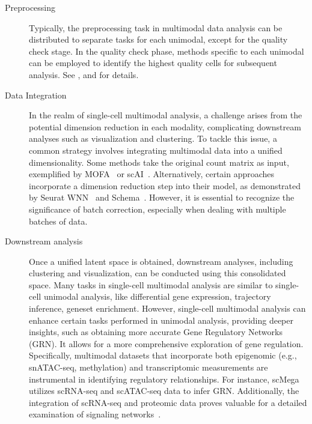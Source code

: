 \begin{description}
	\item[Preprocessing]
	Typically, the preprocessing task in multimodal data analysis can be distributed to separate tasks for each unimodal, except for the quality check stage. In the quality check phase, methods specific to each unimodal can be employed to identify the highest quality cells for subsequent analysis. See ,  and  for details.

	\item[Data Integration]
	In the realm of single-cell multimodal analysis, a challenge arises from the potential dimension reduction in each modality, complicating downstream analyses such as visualization and clustering. To tackle this issue, a common strategy involves integrating multimodal data into a unified dimensionality. Some methods take the original count matrix as input, exemplified by MOFA~\citep{argelaguet2020mofa+} or scAI~\citep{jin2020scai}. Alternatively, certain approaches incorporate a dimension reduction step into their model, as demonstrated by Seurat WNN~\citep{hao2021seurat4} and Schema~\citep{hao2021seurat4,singh2021schema}. However, it is essential to recognize the significance of batch correction, especially when dealing with multiple batches of data.


	\item[Downstream analysis]
	Once a unified latent space is obtained, downstream analyses, including clustering and visualization, can be conducted using this consolidated space. Many tasks in single-cell multimodal analysis are similar to single-cell unimodal analysis, like differential gene expression, trajectory inference, geneset enrichment. However, single-cell multimodal analysis can enhance certain tasks performed in unimodal analysis, providing deeper insights, such as obtaining more accurate Gene Regulatory Networks (GRN). It allows for a more comprehensive exploration of gene regulation. Specifically, multimodal datasets that incorporate both epigenomic (e.g., snATAC-seq, methylation) and transcriptomic measurements are instrumental in identifying regulatory relationships. For instance, scMega~\citep{li2023scmega} utilizes scRNA-seq and scATAC-seq data to infer GRN. Additionally, the integration of scRNA-seq and proteomic data proves valuable for a detailed examination of signaling networks~\citep{heumos2023best}.
\end{description}


